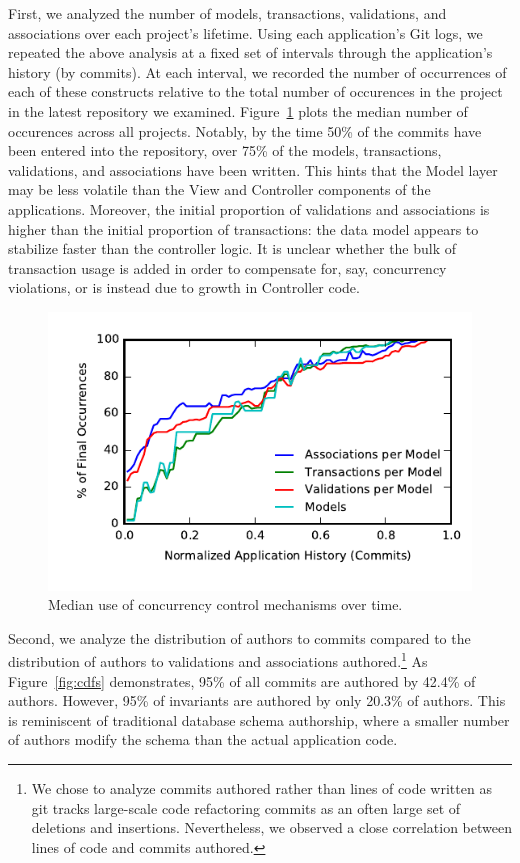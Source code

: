 First, we analyzed the number of models, transactions, validations,
and associations over each project's lifetime. Using each
application's Git logs, we repeated the above analysis at a fixed set
of intervals through the application's history (by commits). At each
interval, we recorded the number of occurrences of each of these
constructs relative to the total number of occurences in the project
in the latest repository we examined. Figure~\ref{fig:historical}
plots the median number of occurences across all projects. Notably, by
the time 50\% of the commits have been entered into the repository,
over 75\% of the models, transactions, validations, and associations
have been written. This hints that the Model layer may be less
volatile than the View and Controller components of the
applications. Moreover, the initial proportion of validations and
associations is higher than the initial proportion of transactions:
the data model appears to stabilize faster than the controller
logic. It is unclear whether the bulk of transaction usage is added in
order to compensate for, say, concurrency violations, or is instead
due to growth in Controller code.

\begin{figure}
\includegraphics[width=\columnwidth]{figs/historical-median.pdf}\vspace{-2em}
\caption{Median use of concurrency control mechanisms over time.}
\label{fig:historical}
\end{figure}

Second, we analyze the distribution of authors to commits compared to
the distribution of authors to validations and associations
authored.\footnote{We chose to analyze commits authored rather than
  lines of code written as git tracks large-scale code refactoring
  commits as an often large set of deletions and
  insertions. Nevertheless, we observed a close correlation between
  lines of code and commits authored.} As Figure~\ref{fig:cdfs} demonstrates, 95\% of all commits
are authored by 42.4\% of authors. However, 95\% of invariants are
authored by only 20.3\% of authors. This is reminiscent of traditional
database schema authorship, where a smaller number of authors modify
the schema than the actual application code.


